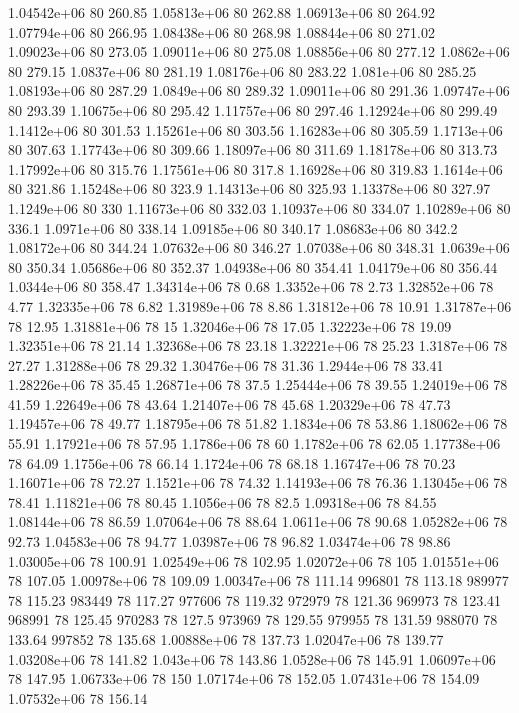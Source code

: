 1.04542e+06 80 260.85
1.05813e+06 80 262.88
1.06913e+06 80 264.92
1.07794e+06 80 266.95
1.08438e+06 80 268.98
1.08844e+06 80 271.02
1.09023e+06 80 273.05
1.09011e+06 80 275.08
1.08856e+06 80 277.12
1.0862e+06 80 279.15
1.0837e+06 80 281.19
1.08176e+06 80 283.22
1.081e+06 80 285.25
1.08193e+06 80 287.29
1.0849e+06 80 289.32
1.09011e+06 80 291.36
1.09747e+06 80 293.39
1.10675e+06 80 295.42
1.11757e+06 80 297.46
1.12924e+06 80 299.49
1.1412e+06 80 301.53
1.15261e+06 80 303.56
1.16283e+06 80 305.59
1.1713e+06 80 307.63
1.17743e+06 80 309.66
1.18097e+06 80 311.69
1.18178e+06 80 313.73
1.17992e+06 80 315.76
1.17561e+06 80 317.8
1.16928e+06 80 319.83
1.1614e+06 80 321.86
1.15248e+06 80 323.9
1.14313e+06 80 325.93
1.13378e+06 80 327.97
1.1249e+06 80 330
1.11673e+06 80 332.03
1.10937e+06 80 334.07
1.10289e+06 80 336.1
1.0971e+06 80 338.14
1.09185e+06 80 340.17
1.08683e+06 80 342.2
1.08172e+06 80 344.24
1.07632e+06 80 346.27
1.07038e+06 80 348.31
1.0639e+06 80 350.34
1.05686e+06 80 352.37
1.04938e+06 80 354.41
1.04179e+06 80 356.44
1.0344e+06 80 358.47
1.34314e+06 78 0.68
1.3352e+06 78 2.73
1.32852e+06 78 4.77
1.32335e+06 78 6.82
1.31989e+06 78 8.86
1.31812e+06 78 10.91
1.31787e+06 78 12.95
1.31881e+06 78 15
1.32046e+06 78 17.05
1.32223e+06 78 19.09
1.32351e+06 78 21.14
1.32368e+06 78 23.18
1.32221e+06 78 25.23
1.3187e+06 78 27.27
1.31288e+06 78 29.32
1.30476e+06 78 31.36
1.2944e+06 78 33.41
1.28226e+06 78 35.45
1.26871e+06 78 37.5
1.25444e+06 78 39.55
1.24019e+06 78 41.59
1.22649e+06 78 43.64
1.21407e+06 78 45.68
1.20329e+06 78 47.73
1.19457e+06 78 49.77
1.18795e+06 78 51.82
1.1834e+06 78 53.86
1.18062e+06 78 55.91
1.17921e+06 78 57.95
1.1786e+06 78 60
1.1782e+06 78 62.05
1.17738e+06 78 64.09
1.1756e+06 78 66.14
1.1724e+06 78 68.18
1.16747e+06 78 70.23
1.16071e+06 78 72.27
1.1521e+06 78 74.32
1.14193e+06 78 76.36
1.13045e+06 78 78.41
1.11821e+06 78 80.45
1.1056e+06 78 82.5
1.09318e+06 78 84.55
1.08144e+06 78 86.59
1.07064e+06 78 88.64
1.0611e+06 78 90.68
1.05282e+06 78 92.73
1.04583e+06 78 94.77
1.03987e+06 78 96.82
1.03474e+06 78 98.86
1.03005e+06 78 100.91
1.02549e+06 78 102.95
1.02072e+06 78 105
1.01551e+06 78 107.05
1.00978e+06 78 109.09
1.00347e+06 78 111.14
996801 78 113.18
989977 78 115.23
983449 78 117.27
977606 78 119.32
972979 78 121.36
969973 78 123.41
968991 78 125.45
970283 78 127.5
973969 78 129.55
979955 78 131.59
988070 78 133.64
997852 78 135.68
1.00888e+06 78 137.73
1.02047e+06 78 139.77
1.03208e+06 78 141.82
1.043e+06 78 143.86
1.0528e+06 78 145.91
1.06097e+06 78 147.95
1.06733e+06 78 150
1.07174e+06 78 152.05
1.07431e+06 78 154.09
1.07532e+06 78 156.14
